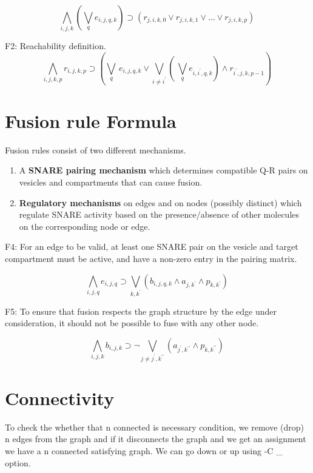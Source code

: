 \documentclass{llncs}
\begin{document}

\[ \bigwedge\limits_{i,j,k} (\bigvee_{q} e_{i,j,q,k}) \supset (r_{j,i,k,0}  \lor r_{j,i,k,1} \lor ... \lor r_{j,i,k,p}) \, \]

F2: Reachability definition.
\[ \bigwedge\limits_{i,j,k,p} r_{i,j,k,p} \supset (\bigvee_{q} \, e_{i,j,q,k} \lor \bigvee_{i\neq i^{\prime}} ( \, \bigvee_{q} e_{i,i^{\prime},q,k}) \land r_{i^{\prime},j,k,p-1} ) \, \]


\section{ Fusion rule Formula}

Fusion rules consist of two different mechanisms.

\begin{enumerate}
\item  A \textbf{SNARE pairing mechanism} which determines compatible Q-R pairs on vesicles and compartments that can cause fusion.
\item \textbf{Regulatory mechanisms} on edges and on nodes (possibly distinct) which regulate SNARE activity based on the presence/absence of other molecules on the corresponding node or edge.
\end{enumerate}

F4: For an edge to be valid, at least one SNARE pair on the vesicle and target compartment must be active, and have a non-zero entry in the pairing matrix.  

\[ \bigwedge\limits_{i,j,q} e_{i,j,q} \supset \bigvee_{k,k^{\prime}} (b_{i,j,q,k} \land a_{j,k^{\prime}} \land p_{k,k^{\prime}}) \, \]

F5: To ensure that fusion respects the graph structure by the edge under consideration, it should not be possible to fuse with any other node.

\[ \bigwedge\limits_{i,j,k} b_{i,j,k} \supset \neg \bigvee_{j \neq j^{\prime}, k^{\prime\prime}} ( a_{j^{\prime},k^{\prime\prime}} \land p_{k,k^{\prime\prime}}) \, \]


\section{Connectivity}
To check the whether that n connected is necessary condition, we remove (drop) n edges from the graph and if it disconnects the graph and we get an assignment we have a n connected satisfying graph. We can go down or up using -C \_ option.  \newline 
\end{document}
